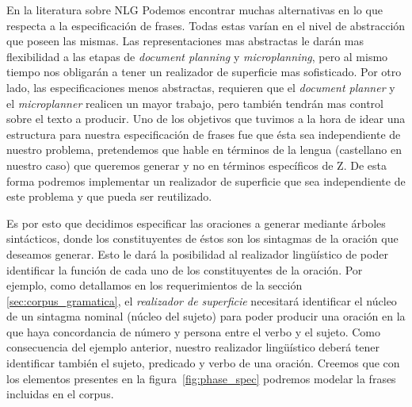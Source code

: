En la literatura sobre NLG Podemos encontrar muchas alternativas en lo que respecta a la especificación de frases. Todas estas varían en el nivel de abstracción que poseen las mismas. Las representaciones mas abstractas le darán mas flexibilidad a las etapas de \textit{document planning} y \textit{microplanning}, pero al mismo tiempo nos obligarán a tener un realizador de superficie mas sofisticado. Por otro lado, las especificaciones menos abstractas, requieren que el \textit{document planner} y el \textit{microplanner} realicen un mayor trabajo, pero también tendrán mas control sobre el texto a producir. Uno de los objetivos que tuvimos a la hora de idear una estructura para nuestra especificación de frases fue que ésta sea independiente de nuestro problema, pretendemos que hable en términos de la lengua (castellano en nuestro caso) que queremos generar y no en términos específicos de Z. De esta forma podremos implementar un realizador de superficie que sea independiente de este problema y que pueda ser reutilizado. %

Es por esto que decidimos especificar las oraciones a generar mediante árboles sintácticos, donde los constituyentes de éstos son los sintagmas de la oración que deseamos generar. Esto le dará la posibilidad al realizador lingüístico de poder identificar la función de cada uno de los constituyentes de la oración. Por ejemplo, como detallamos en los requerimientos de la sección \ref{sec:corpus_gramatica}, el \emph{realizador de superficie} necesitará identificar el núcleo de un sintagma nominal (núcleo del sujeto) para poder producir una oración en la que haya concordancia de número y persona entre el verbo y el sujeto. Como consecuencia del ejemplo anterior, nuestro realizador lingüístico deberá tener identificar también el sujeto, predicado y verbo de una oración. Creemos que con los elementos presentes en la figura~\ref{fig:phase_spec} podremos modelar la frases incluidas en el corpus.

